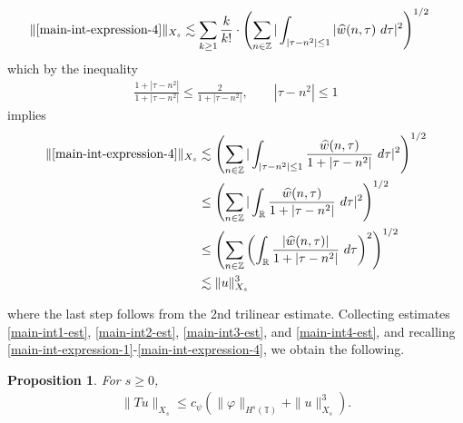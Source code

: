 \documentclass[handout]{beamer}
\numberwithin{equation}{section}
\newcommand{\rr}{\mathbb{R}}
\newcommand{\zz}{\mathbb{Z}}
\newcommand{\ci}{\mathbb{T}}
\newcommand{\wh}{\widehat}
\newcommand{\vp}{\varphi}
\newtheorem{proposition}{Proposition}
\begin{document}
\begin{frame}



\begin{equation*}
	\begin{split}
		\|\eqref{main-int-expression-4} \|_{X_s} 
		& \lesssim \sum_{k \ge 1} \frac{k}{k!} \cdot \left( \sum_{n \in \zz} | 
		\int_{| \tau - n^{2}  |\le 1} | \wh{w}(n, \tau) \ d \tau |^2 
		\right)^{1/2}
	\end{split}
\end{equation*}
%
which by the inequality
%
\begin{equation*}
	\begin{split}
		\frac{1 + | \tau - n^{2 } |}{1 + | \tau  - n^{2 } |} \le 
		\frac{2}{1 + | \tau - n^{2 } |}, \qquad | \tau - n^{2 }  | \le 1
	\end{split}
\end{equation*}
%
implies
%
\begin{equation}
\label{main-int4-est}
	\begin{split}
		\|\eqref{main-int-expression-4}\|_{X_s}
		& \lesssim \left( \sum_{n \in \zz} | \int_{| \tau - n^{2}| \le 1 }
		\frac{\wh{w}(n, \tau)}{1 + | \tau - n^{2 } |} \ d \tau |^2 
		\right)^{1/2}
		\\
		& \le \left( \sum_{n \in \zz} | \int_\rr
		\frac{\wh{w}(n, \tau)}{1 + | \tau - n^{2 } |} \ d \tau |^2 
		\right)^{1/2} \\
		& \le \left( \sum_{n \in \zz} \left( \int_\rr 
		\frac{|\wh{w}(n, \tau)|}{1 + | \tau - n^{2 } |}  \ d \tau  \right)^2
		\right)^{1/2} \\
		& \lesssim \|u\|_{X_s}^3
	\end{split}
\end{equation}

\end{frame}

\begin{frame}
%
where the last step follows from the 2nd trilinear estimate.
Collecting estimates \eqref{main-int1-est}, \eqref{main-int2-est}, 
\eqref{main-int3-est}, and \eqref{main-int4-est}, and recalling 
\eqref{main-int-expression-1}-\eqref{main-int-expression-4}, we obtain the 
following.

\end{frame}
%
%
%				 
%
%
\begin{frame}
\begin{proposition}
	\label{prop:contraction}
	For $s \ge 0$, 
\begin{equation*}
	\begin{split}
		\|Tu\|_{X_s} \le c_\psi \left( \|\vp \|_{H^s(\ci)} + \|u\|_{X_s}^3 
		\right).
	\end{split}
\end{equation*}
%
\end{proposition}

\end{frame}
\end{document}
